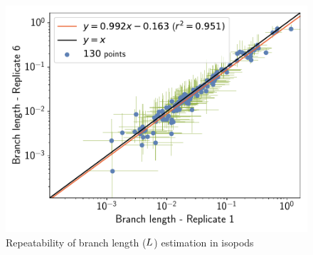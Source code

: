 \documentclass{article}
\begin{document}
\begin{figure}[H]
\begin{minipage}{0.32\linewidth}
			\includegraphics[width=\linewidth, page=1]{isopods/12CDS_SiteMutSelBranchNe_Rep-1-6_Log10BranchLength}
		\end{minipage}
		\caption[Repeatability of branch length estimation in isopods]{Repeatability of branch length ($L$) estimation in isopods}
	\end{figure}
\end{document}
